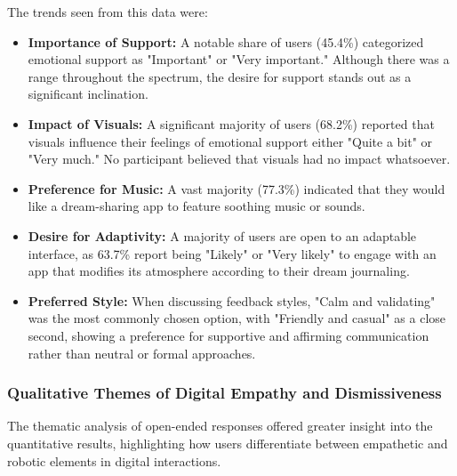 \documentclass[conference]{IEEEtran}
\begin{document}
	The trends seen from this data were:
	\begin{itemize}
		\item \textbf{Importance of Support:} A notable share of users (45.4\%) categorized emotional support as "Important" or "Very important." Although there was a range throughout the spectrum, the desire for support stands out as a significant inclination.
		\item \textbf{Impact of Visuals:} A significant majority of users (68.2\%) reported that visuals influence their feelings of emotional support either "Quite a bit" or "Very much." No participant believed that visuals had no impact whatsoever.
		\item \textbf{Preference for Music:} A vast majority (77.3\%) indicated that they would like a dream-sharing app to feature soothing music or sounds.
		\item \textbf{Desire for Adaptivity:} A majority of users are open to an adaptable interface, as 63.7\% report being "Likely" or "Very likely" to engage with an app that modifies its atmosphere according to their dream journaling.
		\item \textbf{Preferred Style:} When discussing feedback styles, "Calm and validating" was the most commonly chosen option, with "Friendly and casual" as a close second, showing a preference for supportive and affirming communication rather than neutral or formal approaches.
	\end{itemize}
	
	\subsubsection{Qualitative Themes of Digital Empathy and Dismissiveness}
	The thematic analysis of open-ended responses offered greater insight into the quantitative results, highlighting how users differentiate between empathetic and robotic elements in digital interactions.
	
\end{document}
